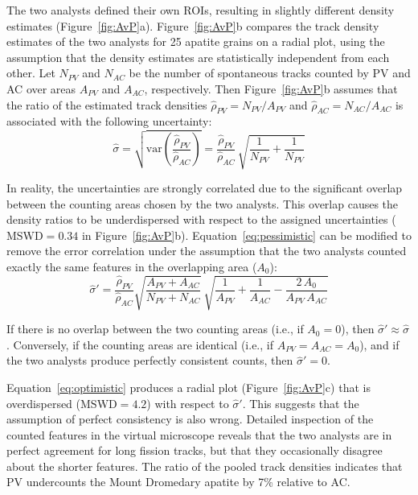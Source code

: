 \documentclass[gchron, manuscript]{copernicus}
\begin{document}
The two analysts defined their own ROIs, resulting in slightly
different density estimates
(Figure~\ref{fig:AvP}a). Figure~\ref{fig:AvP}b compares the track
density estimates of the two analysts for 25 apatite grains on a
radial plot, using the assumption that the density estimates are
statistically independent from each other. Let $N_{PV}$ and $N_{AC}$
be the number of spontaneous tracks counted by PV and AC over areas
$A_{PV}$ and $A_{AC}$, respectively. Then Figure~\ref{fig:AvP}b
assumes that the ratio of the estimated track densities
$\hat{\rho}_{PV} = N_{PV}/A_{PV}$ and $\hat{\rho}_{AC} =
N_{AC}/A_{AC}$ is associated with the following uncertainty:
\begin{equation}
  \hat{\sigma} =
  \sqrt{\mbox{var}\left(\frac{\hat{\rho}_{PV}}{\hat{\rho}_{AC}}\right)} =
  \frac{\hat{\rho}_{PV}}{\hat{\rho}_{AC}} \, \sqrt{\frac{1}{N_{PV}} +
    \frac{1}{N_{PV}} }
  \label{eq:pessimistic}
\end{equation}

In reality, the uncertainties are strongly correlated due to the
significant overlap between the counting areas chosen by the two
analysts. This overlap causes the density ratios to be underdispersed
with respect to the assigned uncertainties ($\mbox{MSWD}=0.34$ in
Figure~\ref{fig:AvP}b).  Equation~\ref{eq:pessimistic} can be modified
to remove the error correlation under the assumption that the two
analysts counted exactly the same features in the overlapping area
($A_0$):
\begin{equation}
  \hat{\sigma}' =
  \frac{\hat{\rho}_{PV}}{\hat{\rho}_{AC}}
  \sqrt{\frac{A_{PV}+A_{AC}}{N_{PV}+N_{AC}}}\,
  \sqrt{
    \frac{1}{A_{PV}} + \frac{1}{A_{AC}} - \frac{2\,A_0}{A_{PV}\,A_{AC}}
  }
  \label{eq:optimistic}
\end{equation}

If there is no overlap between the two counting areas (i.e., if
$A_0=0$), then $\hat{\sigma}' \approx \hat{\sigma}$. Conversely, if
the counting areas are identical (i.e., if $A_{PV}=A_{AC}=A_0$), and
if the two analysts produce perfectly consistent counts, then
$\hat{\sigma}'=0$.\medskip

Equation~\ref{eq:optimistic} produces a radial plot
(Figure~\ref{fig:AvP}c) that is overdispersed ($\mbox{MSWD}=4.2$) with
respect to $\hat{\sigma}'$. This suggests that the assumption of
perfect consistency is also wrong. Detailed inspection of the counted
features in the virtual microscope reveals that the two analysts are
in perfect agreement for long fission tracks, but that they
occasionally disagree about the shorter features. The ratio of the
pooled track densities indicates that PV undercounts the Mount
Dromedary apatite by 7\% relative to AC.
\medskip
\end{document}
